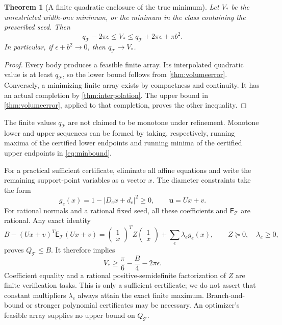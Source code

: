 \documentclass[11pt]{article}
\newtheorem{theorem}{Theorem}[section]
\theoremstyle{remark}\newtheorem{remark}[theorem]{Remark}
\numberwithin{equation}{section}
\begin{document}
\begin{theorem}[A finite quadratic enclosure of the true minimum]
Let $V_*$ be the unrestricted width-one minimum, or the minimum in the
class containing the prescribed seed. Then
\begin{equation}\label{eq:minbound}
 \boxed{q_{\mathcal T}-2\pi\epsilon\le V_*
 \le q_{\mathcal T}+2\pi\epsilon+\pi b^2.}
\end{equation}
In particular, if $\epsilon+b^2\to0$, then $q_{\mathcal T}\to V_*$.
\end{theorem}
\begin{proof}
Every body produces a feasible finite array. Its interpolated quadratic
value is at least $q_{\mathcal T}$, so the lower bound follows from
\cref{thm:volumeerror}. Conversely, a minimizing finite array exists by
compactness and continuity. It has an actual completion by
\cref{thm:interpolation}. The upper bound in \cref{thm:volumeerror}, applied
to that completion, proves the other inequality.
\end{proof}

The finite values $q_{\mathcal T}$ are not claimed to be monotone under
refinement. Monotone lower and upper sequences can be formed by taking,
respectively, running maxima of the certified lower endpoints and running
minima of the certified upper endpoints in \cref{eq:minbound}.

For a practical sufficient certificate, eliminate all affine equations and
write the remaining support-point variables as a vector $x$. The diameter
constraints take the form
\[
 g_e(x)=1-|D_ex+d_e|^2\ge0,
 \qquad \mathbf u=Ux+v.
\]
For rational normals and a rational fixed seed, all these coefficients and
$\mathsf E_{\mathcal T}$ are rational. Any exact identity
\begin{equation}\label{eq:sdpcert}
 B-(Ux+v)^T\mathsf E_{\mathcal T}(Ux+v)
 =\begin{pmatrix}1\\x\end{pmatrix}^{\!T}
 Z\begin{pmatrix}1\\x\end{pmatrix}
 +\sum_e\lambda_e g_e(x),
 \qquad Z\succeq0,\quad\lambda_e\ge0,
\end{equation}
proves $Q_{\mathcal T}\le B$. It therefore implies
\[
 V_*\ge\frac\pi6-\frac B4-2\pi\epsilon.
\]
Coefficient equality and a rational positive-semidefinite factorization of
$Z$ are finite verification tasks. This is only a sufficient certificate;
we do not assert that constant multipliers $\lambda_e$ always attain the
exact finite maximum. Branch-and-bound or stronger polynomial certificates
may be necessary. An optimizer's feasible array supplies no upper bound on
$Q_{\mathcal T}$.
\end{document}
